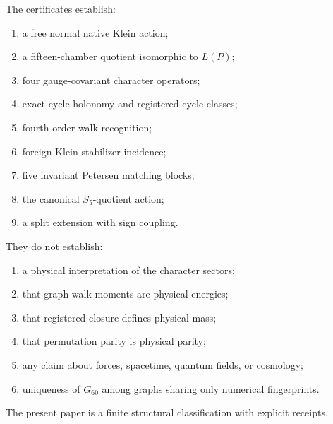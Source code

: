 The certificates establish:

\begin{enumerate}
    \item a free normal native Klein action;
    \item a fifteen-chamber quotient isomorphic to \(L(P)\);
    \item four gauge-covariant character operators;
    \item exact cycle holonomy and registered-cycle classes;
    \item fourth-order walk recognition;
    \item foreign Klein stabilizer incidence;
    \item five invariant Petersen matching blocks;
    \item the canonical \(S_5\)-quotient action;
    \item a split extension with sign coupling.
\end{enumerate}

They do not establish:

\begin{enumerate}
    \item a physical interpretation of the character sectors;
    \item that graph-walk moments are physical energies;
    \item that registered closure defines physical mass;
    \item that permutation parity is physical parity;
    \item any claim about forces, spacetime, quantum fields, or
    cosmology;
    \item uniqueness of \(G_{60}\) among graphs sharing only numerical
    fingerprints.
\end{enumerate}

The present paper is a finite structural classification with explicit
receipts.
